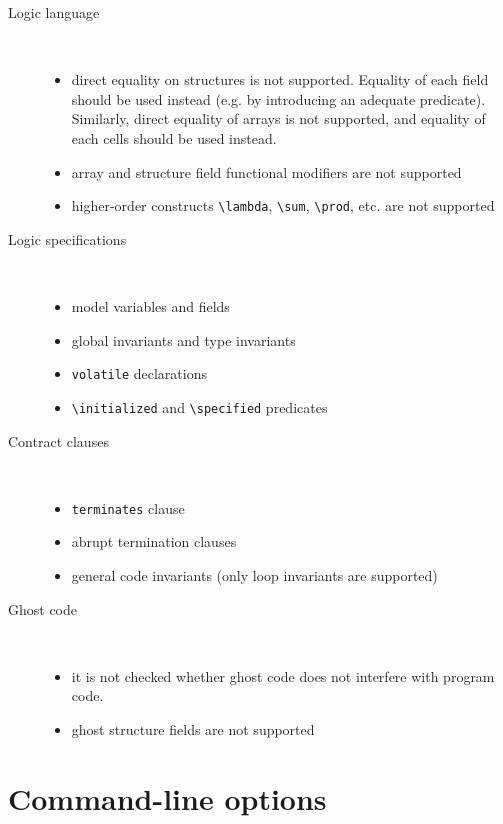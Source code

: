 \documentclass[a4paper,11pt,twoside,openright]{report}
\begin{document}
\begin{description}
\item[Logic language] ~\\
  \begin{itemize}
  \item direct equality on structures is not supported. Equality of
    each field should be used instead (e.g. by introducing an adequate
    predicate). Similarly, direct equality of arrays is not supported,
    and equality of each cells should be used instead.
  \item array and structure field functional modifiers are not supported
  \item higher-order constructs \verb|\lambda|, \verb|\sum|,
    \verb|\prod|, etc. are not supported
  \end{itemize}
\item[Logic specifications] ~\\
  \begin{itemize}
  \item model variables and fields
  \item global invariants and type invariants
  \item \verb|volatile| declarations
  \item \verb|\initialized| and \verb|\specified| predicates
  \end{itemize}
\item[Contract clauses] ~\\
  \begin{itemize}
  \item \texttt{terminates} clause
  \item abrupt termination clauses
  \item general code invariants (only loop invariants are supported)
  \end{itemize}
\item[Ghost code] ~\\
  \begin{itemize}
  \item it is not checked whether ghost code does not interfere with
    program code.
  \item ghost structure fields are not supported
  \end{itemize}

\end{description}

\section{Command-line options}
\end{document}

